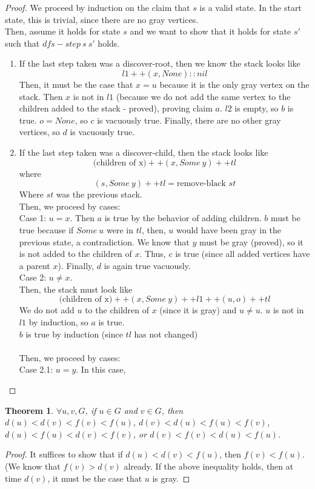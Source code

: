 \documentclass{article}
\newtheorem{theorem}{Theorem}[section]
\begin{document}
\begin{proof}
We proceed by induction on the claim that $s$ is a valid state. In the start state, this is trivial, since there are no gray vertices.
\\Then, assume it holds for state $s$ and we want to show that it holds for state $s'$ such that $dfs-step~s~s'$ holds.
\begin{enumerate}
\item
If the last step taken was a discover-root, then we know the stack looks like
\[l1 ++ (x, None) :: nil\]
Then, it must be the case that $x=u$ because it is the only gray vertex on the stack. Then $x$ is not in $l1$ (because we do not add the same vertex to the children added to the stack - proved), proving claim $a$. $l2$ is empty, so $b$ is true. $o=None$, so $c$ is vacuously true. Finally, there are no other gray vertices, so $d$ is vacuously true.
\item
If the last step taken was a discover-child, then the stack looks like
\[ \text{(children of x)} ++ (x, Some~y) ++ tl\]
where 
\[(s, Some~y) ++ tl = \text{remove-black } st \]
Where $st$ was the previous stack.
\\Then, we proceed by cases:
\\Case 1: $u=x$. Then $a$ is true by the behavior of adding children. $b$ must be true because if $Some~u$ were in $tl$, then, $u$ would have been gray in the previous state, a contradiction. We know that $y$ must be gray (proved), so it is not added to the children of $x$. Thus, $c$ is true (since all added vertices have a parent $x$). Finally, $d$ is again true vacuously.
\\Case 2: $u\neq x$.
\\Then, the stack must look like
\[ \text{(children of x)} ++ (x, Some~y) ++ l1 ++ (u, o) ++ tl\]
We do not add $u$ to the children of $x$ (since it is gray) and $u\neq u$. $u$ is not in $l1$ by induction, so $a$ is true.
\\$b$ is true by induction (since $tl$ has not changed)
\\
\\Then, we proceed by cases:
\\Case 2.1: $u=y$. In this case, 
\end{enumerate}
\end{proof}
\begin{theorem}
$\forall u, v, G$, if $u\in G$ and $v\in G$, then $d(u) < d(v) < f(v) < f(u)$, $d(v) < d(u) < f(u) < f(v)$, $d(u) < f(u) < d(v) < f(v)$, or $d(v) < f(v) < d(u) < f(u)$.
\end{theorem}
\begin{proof}
It suffices to show that if $d(u) < d(v) < f(u)$, then $f(v) < f(u)$. (We know that $f(v) > d(v)$ already. If the above inequality holds, then at time $d(v)$, it must be the case that $u$ is gray. 
\end{proof}
\end{document}

